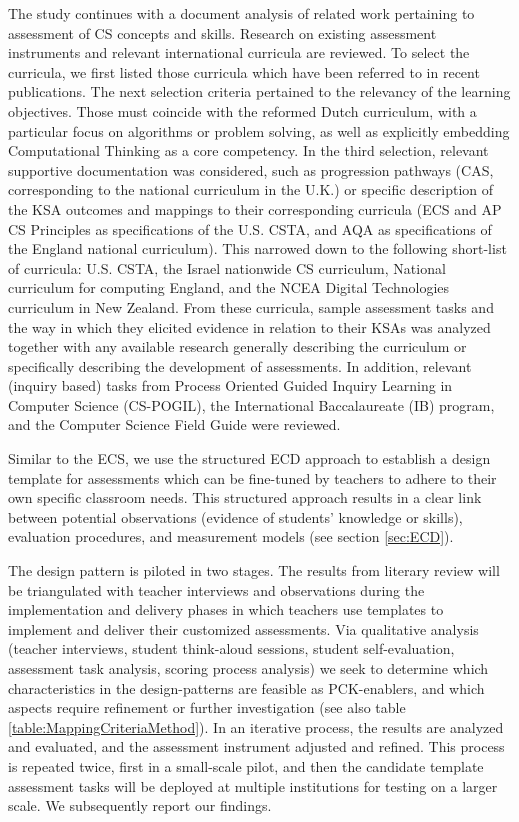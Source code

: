The study continues with a document analysis of related work pertaining to assessment of CS concepts and skills. Research on existing assessment instruments and relevant international curricula are reviewed. To select the curricula, we first listed those curricula which have been referred to in recent publications. The next selection criteria pertained to the relevancy of the learning objectives. Those must coincide with the reformed Dutch curriculum, with a particular focus on algorithms or problem solving, as well as explicitly embedding Computational Thinking as a core competency. In the third selection, relevant supportive documentation was considered, such as progression pathways (CAS, corresponding to the national curriculum in the U.K.) or specific description of the KSA outcomes and mappings to their corresponding curricula (ECS and AP CS Principles as specifications of the U.S. CSTA, and AQA as specifications of the England national curriculum). This narrowed down to the following short-list of curricula: U.S. CSTA, the Israel nationwide CS curriculum, National curriculum for computing England, and the NCEA Digital Technologies curriculum in New Zealand. From these curricula, sample assessment tasks and the way in which they elicited evidence in relation to their KSAs was analyzed together with any available research generally describing the curriculum or specifically describing the development of assessments. In addition, relevant (inquiry based) tasks from Process Oriented Guided Inquiry Learning in Computer Science (CS-POGIL), the International Baccalaureate (IB) program, and the Computer Science Field Guide \cite{CSFieldGuide} were reviewed.


Similar to the ECS, we use the structured ECD approach to establish a design template for assessments which can be fine-tuned by teachers to adhere to their own specific classroom needs. This structured approach results in a clear link between potential observations (evidence of students' knowledge or skills), evaluation procedures, and measurement models (see section \ref{sec:ECD}).


The design pattern is piloted in two stages. The results from literary review will be triangulated with teacher interviews and observations during the implementation and delivery phases in which teachers use templates to implement and deliver their customized assessments. Via qualitative analysis (teacher interviews, student think-aloud sessions, student self-evaluation, assessment task analysis, scoring process analysis) we seek to determine which characteristics in the design-patterns are feasible as PCK-enablers, and which aspects require refinement or further investigation (see also table \ref{table:MappingCriteriaMethod}). In an iterative process, the results are analyzed and evaluated, and the assessment instrument adjusted and refined. This process is repeated twice, first in a small-scale pilot, and then the candidate template assessment tasks will be deployed at multiple institutions for testing on a larger scale. We subsequently report our findings.



